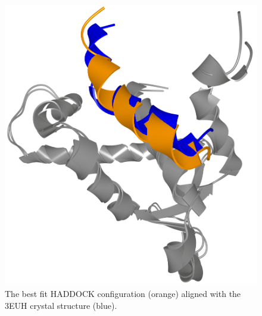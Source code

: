 \documentclass{bmcart}
\begin{document}
\begin{backmatter}
\begin{figure}[h!]
  \centering
  \includegraphics[width=0.9\columnwidth]{images/figure17.png}
  \caption{ The best fit HADDOCK configuration (orange) aligned with the 3EUH crystal structure (blue).}
  \label{fig:MukEF_selection_3_best_pair}
\end{figure}


\end{backmatter}
\end{document}
